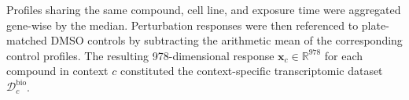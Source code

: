 \documentclass[11pt,a4paper]{article}
\begin{document}
Profiles sharing the same compound, cell line, and exposure time were
aggregated gene-wise by the median. Perturbation responses were then referenced
to plate-matched DMSO controls by subtracting the arithmetic mean of the
corresponding control profiles. The resulting 978-dimensional response
$\mathbf x_c\in\mathbb R^{978}$ for each compound in context $c$ constituted
the context-specific transcriptomic dataset $\mathcal D^{\mathrm{bio}}_c$.

\clearpage
\end{document}

